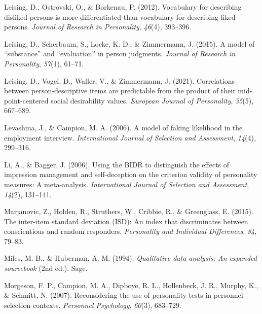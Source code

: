 \documentclass[
  ,jou]{apa6}
\newlength{\cslhangindent}
\newlength{\cslentryspacingunit} %
\newenvironment{CSLReferences}[2] %
 {%
  \setlength{\parindent}{0pt}
  \ifodd #1
  \let\oldpar\par
  \def\par{\hangindent=\cslhangindent\oldpar}
  \fi
  \setlength{\parskip}{#2\cslentryspacingunit}
 }%
 {}
\begin{document}
\begin{CSLReferences}{1}{0}
\leavevmode{}%
Leising, D., Ostrovski, O., \& Borkenau, P. (2012). Vocabulary for describing disliked persons is more differentiated than vocabulary for describing liked persons. \emph{Journal of Research in Personality}, \emph{46}(4), 393--396.

\leavevmode{}%
Leising, D., Scherbaum, S., Locke, K. D., \& Zimmermann, J. (2015). A model of {``substance''} and {``evaluation''} in person judgments. \emph{Journal of Research in Personality}, \emph{57}(1), 61--71.

\leavevmode{}%
Leising, D., Vogel, D., Waller, V., \& Zimmermann, J. (2021). Correlations between person-descriptive items are predictable from the product of their mid-point-centered social desirability values. \emph{European Journal of Personality}, \emph{35}(5), 667--689.

\leavevmode{}%
Levashina, J., \& Campion, M. A. (2006). A model of faking likelihood in the employment interview. \emph{International Journal of Selection and Assessment}, \emph{14}(4), 299--316.

\leavevmode{}%
Li, A., \& Bagger, J. (2006). Using the {BIDR} to distinguish the effects of impression management and self-deception on the criterion validity of personality measures: A meta-analysis. \emph{International Journal of Selection and Assessment}, \emph{14}(2), 131--141.

\leavevmode{}%
Marjanovic, Z., Holden, R., Struthers, W., Cribbie, R., \& Greenglass, E. (2015). The inter-item standard deviation ({ISD}): An index that discriminates between conscientious and random responders. \emph{Personality and Individual Differences}, \emph{84}, 79--83.

\leavevmode{}%
Miles, M. B., \& Huberman, A. M. (1994). \emph{Qualitative data analysis: An expanded sourcebook} (2nd ed.). Sage.

\leavevmode{}%
Morgeson, F. P., Campion, M. A., Dipboye, R. L., Hollenbeck, J. R., Murphy, K., \& Schmitt, N. (2007). Reconsidering the use of personality tests in personnel selection contexts. \emph{Personnel Psychology}, \emph{60}(3), 683--729.


\end{CSLReferences}
\end{document}
